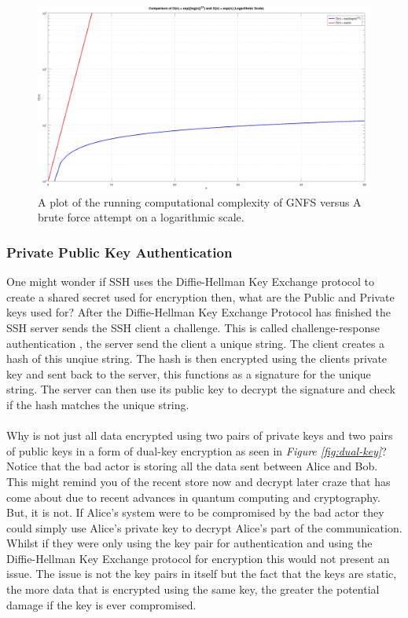 \documentclass[12pt]{article}
\begin{document}
\begin{figure}
  \centering
  \includegraphics[width=\textwidth]{graph.png}
  \caption{A plot of the running computational complexity of GNFS versus A brute force attempt on a logarithmic scale.}
  \label{fig:running-complexity}
\end{figure}

\subsubsection{Private Public Key Authentication}
One might wonder if SSH uses the Diffie-Hellman Key Exchange protocol to create a shared secret 
used for encryption then, what are the Public and Private keys used for?
After the Diffie-Hellman Key Exchange Protocol has finished the SSH server sends the SSH client a challenge.
This is called challenge-response authentication \cite{ChallengeResponseAuthentication2024}, the 
server send the client a unique string. The client creates a hash of this unqiue string. The hash 
is then encrypted using the clients private key and sent back to the server, this functions as 
a signature for the unique string. The server can then use its public key to decrypt the signature and check if 
the hash matches the unique string.
\\
\\
Why is not just all data encrypted using two pairs of private keys and two pairs of public keys in a form 
of dual-key encryption as seen in \textit{Figure \ref{fig:dual-key}}?
Notice that the bad actor is storing all the data sent between Alice and Bob.
This might remind you of the recent store now and decrypt later craze that has come about due 
to recent advances in quantum computing and cryptography. But, it is not. 
If Alice's system were to be compromised by the bad actor they could simply use 
Alice's private key to decrypt Alice's part of the communication.
Whilst if they were only using the key pair for authentication and using the 
Diffie-Hellman Key Exchange protocol for encryption this would not present an issue.
The issue is not the key pairs in itself but the fact that the keys are static, 
the more data that is encrypted using the same key, the greater the potential damage if 
the key is ever compromised.
\end{document}
